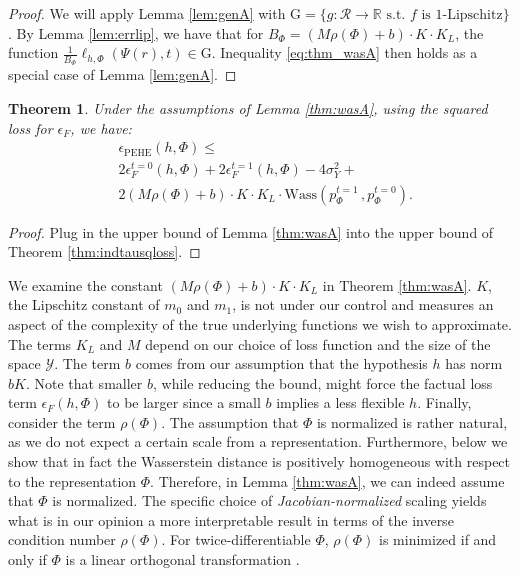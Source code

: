 \documentclass{article}
\newtheorem{thmappthm}{Theorem}
\def\cY{\mathcal Y}
\def\cF{\mathrm{G}}
\def\cR{\mathcal{R}}
\def \R{\mathbb{R}}
\def \epehe{\epsilon_{\text{PEHE}}}
\newcommand{\pc}{p^{t=0}}
\newcommand{\pt}{p^{t=1}}
\newcommand{\lythr}{\ell_{h,\Phi}(\Psi(r),t)}
\begin{document}
\begin{proof}
We will apply Lemma \ref{lem:genA} with $\cF = \{g: \cR \rightarrow \R \text{ s.t. } f  \text{ is } 1 \text{-Lipschitz}\}$. By Lemma \ref{lem:errlip}, we have that for $B_\Phi = \left(M \rho(\Phi) +b\right) \cdot K  \cdot K_L$, the function $\frac{1}{B_\Phi} \lythr \in \cF$. Inequality \eqref{eq:thm_wasA} then holds as a special case of Lemma \ref{lem:genA}.
\end{proof}
\begin{thmappthm}Under the assumptions of Lemma \ref{thm:wasA}, using the squared loss for $\epsilon_F$, we have:
\begin{align*}
&\epehe(h,\Phi) \leq \nonumber \\
&2 \epsilon^{t=0}_F(h,\Phi)  + 2\epsilon^{t=1}_F(h,\Phi)  - 4\sigma^2_Y +  \nonumber \\
&2 \left(M \rho(\Phi) +b\right) \cdot K  \cdot K_L \cdot \text{Wass}( \pt_\Phi \, ,  \pc_\Phi) .
\end{align*}
\end{thmappthm}
\begin{proof}
Plug in the upper bound of Lemma \ref{thm:wasA} into the upper bound of Theorem \ref{thm:indtausqloss}.
\end{proof}


We examine the constant $\left(M \rho(\Phi) +b\right) \cdot K \cdot K_L$ in Theorem \ref{thm:wasA}. $K$, the Lipschitz constant of $m_0$ and $m_1$, is not under our control and measures an aspect of the complexity of the true underlying functions we wish to approximate. The terms $K_L$ and $M$ depend on our choice of loss function and the size of the space $\cY$. The term $b$ comes from our assumption that the hypothesis $h$ has norm $ b K$. Note that smaller $b$, while reducing the bound, might force the factual loss term $\epsilon_F(h,\Phi)$ to be larger since a small $b$ implies a less flexible $h$. Finally, consider the term $\rho(\Phi)$.
The assumption that $\Phi$ is normalized is rather natural, as we do not expect a certain scale from a representation. Furthermore, below we show that in fact the Wasserstein distance is positively homogeneous with respect to the representation $\Phi$. Therefore, in Lemma \ref{thm:wasA}, we can indeed assume that $\Phi$ is normalized. The specific choice of \emph{Jacobian-normalized} scaling yields what is in our opinion a more interpretable result in terms of the inverse condition number $\rho(\Phi)$. For twice-differentiable $\Phi$, $\rho(\Phi)$ is minimized if and only if $\Phi$ is a linear orthogonal transformation \cite{mathover}. 
\end{document}
